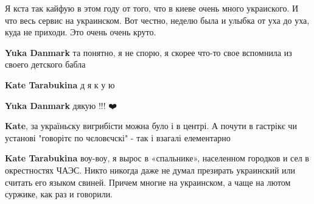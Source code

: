 \begin{itemize}
\begin{itemize}
 

Я кста так кайфую в этом году от того, что в киеве очень много украиского. И
что весь сервис на украинском. Вот честно, неделю была и улыбка от уха до уха,
куда не приходи. Это очень очень круто.


 

\textbf{Yuka Danmark} та понятно, я не спорю, я скорее что-то свое вспомнила из своего детского бабла

 
\textbf{Kate Tarabukina} д я к у ю 🌿

 
\textbf{Yuka Danmark} дякую !!! ❤️

 
\textbf{Kate}, за україньску вигрибісти можна було і в центрі. А почути в
гастрікє чи установі "говорітє по чєловєчскі" - так і взагалі елементарно

 
\textbf{Kate Tarabukina} воу-воу, я вырос в «спальнике», населенном городков и сел в окрестностях ЧАЭС. Никто никогда даже не думал презирать украинский или считать его языком свиней. Причем многие на украинском, а чаще на лютом суржике, как раз и говорили.


\end{itemize}
\end{itemize}
